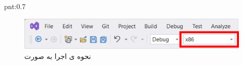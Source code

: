 \begin{point}{pnt:0.7}
{\begin{spacing}{1.5}
        \begin{figure}[H]
            \centering
            \setlength{\belowcaptionskip}{-10pt}
            \includegraphics[width=\textwidth]{Images/3/3.Intro.5.13}
            \caption{نحوه ی اجرا به صورت  \textbf{\vspace{12pt}}}
            \label{fig:3.Intro.5.13}
        \end{figure}
    \end{spacing}
}
\end{point}
\textbf{\vspace{6pt}}

\newpage